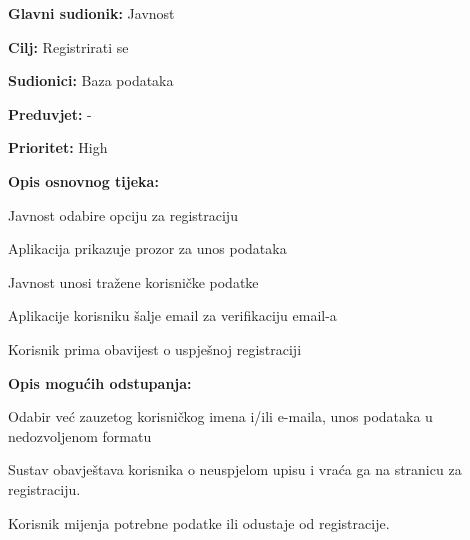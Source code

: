 \noindent {}
	\begin{packed_item}
	
		\item \textbf{Glavni sudionik: }Javnost
		\item  \textbf{Cilj:} Registrirati se
		\item  \textbf{Sudionici:} Baza podataka
		\item  \textbf{Preduvjet:} -
		\item  \textbf{Prioritet:} High
		\item  \textbf{Opis osnovnog tijeka:}
		
		\item[] \begin{packed_enum}

			\item Javnost odabire opciju za registraciju
			\item Aplikacija prikazuje prozor za unos podataka
			\item Javnost unosi tražene korisničke podatke
			\item Aplikacije korisniku šalje email za verifikaciju email-a
			\item Korisnik prima obavijest o uspješnoj registraciji
		\end{packed_enum}
		
		\item  \textbf{Opis mogućih odstupanja:}
		
		\item[] \begin{packed_item}

			\item[2.a] Odabir već zauzetog korisničkog imena i/ili e-maila, unos podataka u nedozvoljenom formatu
			\item[] \begin{packed_enum}

				\item Sustav obavještava korisnika o neuspjelom upisu i vraća ga na stranicu za registraciju.
				\item Korisnik mijenja potrebne podatke ili odustaje od registracije.

			\end{packed_enum}
		\end{packed_item}						
	\end{packed_item}

